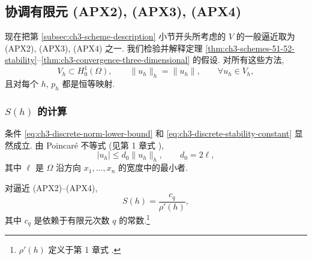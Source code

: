 \hypertarget{chapter-03-page-268}{}
\subsection{协调有限元 (APX2), (APX3), (APX4)}
\label{subsec:ch3-conforming-finite-elements}

现在把第 \ref{subsec:ch3-scheme-description} 小节开头所考虑的 $V$ 的一般逼近取为 (APX2), (APX3), (APX4) 之一. 我们检验并解释定理 \ref{thm:ch3-schemes-51-52-stability}--\ref{thm:ch3-convergence-three-dimensional} 的假设. 对所有这些方法,
\begin{equation}
V_h\subset H_0^1(\Omega),\qquad
\lVert u_h\rVert_h=\lVert u_h\rVert,
\qquad\forall u_h\in V_h,
\label{eq:ch3-conforming-space-norm}
\end{equation}
且对每个 $h$, $p_h$ 都是恒等映射.

\subsubsection{$S(h)$ 的计算}
条件 \eqref{eq:ch3-discrete-norm-lower-bound} 和 \eqref{eq:ch3-discrete-stability-constant} 显然成立. 由 Poincar\'e 不等式 (见第 1 章式 ),
\begin{equation}
|u_h|\leq d_0\lVert u_h\rVert_h,
\qquad d_0=2\ell,
\label{eq:ch3-conforming-poincare}
\end{equation}
其中 $\ell$ 是 $\Omega$ 沿方向 $x_1,\ldots,x_n$ 的宽度中的最小者.

\begin{Proposition}
\label{prop:ch3-conforming-stability-constant}
对逼近 (APX2)--(APX4),
\begin{equation}
S(h)=\frac{c_q}{\rho'(h)},
\label{eq:ch3-conforming-stability-constant}
\end{equation}
其中 $c_q$ 是依赖于有限元次数 $q$ 的常数.\footnote{$\rho'(h)$ 定义于第 1 章式 .}
\end{Proposition}

